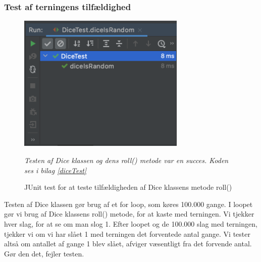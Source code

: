 \subsubsection{Test af terningens tilfældighed}
    \begin{figure}[H]
        \centering
        \includegraphics[width=8cm]{figures/diceIsRandomTest.png}
        \caption{JUnit test for at teste tilfældigheden af Dice klassens metode roll()}
        \emph{Testen af Dice klassen og dens roll() metode var en succes. Koden ses i bilag \ref{diceTest}}
    \end{figure}
    Testen af Dice klassen gør brug af et for loop, som køres 100.000 gange. I loopet gør vi brug af Dice klassens roll() metode, for at kaste med terningen. Vi tjekker hver slag, for at se om man slog 1. Efter loopet og de 100.000 slag med terningen, tjekker vi om vi har slået 1 med terningen det forventede antal gange. Vi tester altså om antallet af gange 1 blev slået, afviger væsentligt fra det forvende antal. Gør den det, fejler testen.
    

